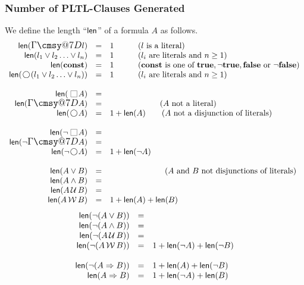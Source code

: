 \documentclass[nohyperref]{acmtrans2f}
\makeatletter
\def\sometime{\mathord{\hbox{\large$\mathchar"0\cmsy@7D$}}}
\newcommand{\always}{\raisebox{-.2ex}{
                           \mbox{\unitlength=0.9ex
                           \begin{picture}(2,2)
                           \linethickness{0.06ex}
                           \put(0,0){\line(1,0){2}}
                           \put(0,2){\line(1,0){2}}
                           \put(0,0){\line(0,1){2}}
                           \put(2,0){\line(0,1){2}}
                           \end{picture}}}
                          \,}
\newcommand{\next}{\!\raisebox{-.2ex}{ %
                        \mbox{\unitlength=0.9ex
                        \begin{picture}(2,2)
                        \linethickness{0.06ex}
                        \put(1,1){\circle{2}} %
                        \end{picture}}}       %
                        \,}
\def\until{\hbox{$\,\cal U \,$}}
\def\unless{\hbox{$\,\cal W \,$}}
\let\imp=\Rightarrow
\def\ltrue{\hbox{\rm\bf true}}
\def\lfalse{\hbox{\rm\bf false}}
\newcommand{\len}{{\sf len}}
\newcommand{\const}{\hbox{\bf const}}
\makeatother
\begin{document}
\subsubsection{Number of PLTL-Clauses Generated}
%
We define the length ``$\sf{len}$'' of a formula $A$ as follows.
$$
\begin{array}{rcl}
\len(\sometime l) & = & 1  \qquad\quad (l \mbox{ is a literal})\\
\len(l_1 \lor l_2 \ldots \lor l_n) & = & 1 \qquad\quad (l_i \mbox{ are
literals and } n \geq 1)\\
\len(\const{}) & = & 1  \qquad\quad (\const{}
\mbox{ is one of } \ltrue, \neg \ltrue, \lfalse \mbox{ or } \neg \lfalse) \\
%
\len(\next(l_1 \lor l_2 \ldots \lor l_n)) & = & 1 \qquad\quad (l_i \mbox{
are literals and } n \geq 1)\\
\\
 \len(\always A) & = & %
\\
 \len(\sometime A) & = &   \:\qquad\qquad\qquad (A \mbox{ not
a literal})\\
 \len(\next A) & = & 1 + \len(A)  \qquad (A \mbox{ not a
                                  disjunction of literals})\\ 
\\
\len(\neg \always A) & = & %
\\
\len(\neg \sometime A) & = & %
\\
\len(\neg \next A) & = & 1 + \len(\neg A) \\
%
\\
 \len(A \lor B) & = &  \!\qquad \qquad \qquad\quad (A \mbox{ and }
B \mbox{ not disjunctions of literals)}\\
 \len(A \land B) & = & %
\\
 \len(A \until B) & = & %
\\
 \len(A \unless B) & = & 1 + \len(A) + \len(B)\\
\end{array}
$$
%
$$
\begin{array}{rcl}
\len(\neg (A \lor B)) & = & %
\\
\len(\neg (A \land B)) & = & %
\\
\len(\neg (A \until B)) & = & %
\\
\len(\neg (A \unless B)) & = & 1 + \len(\neg A) + \len(\neg B) \\
%
%
\\
\len(\neg (A \imp B)) & = & 1 + \len(A) + \len(\neg B) \\
 \len(A \imp B) & = & 1 + \len(\neg A) + \len(B) \\
\end{array}
$$
\end{document}
